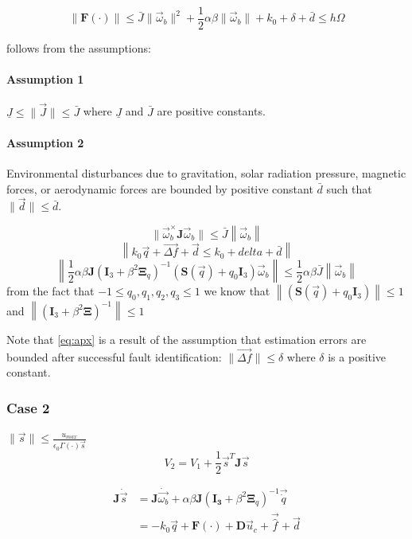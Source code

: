 \begin{equation}
    \lVert\mathbf{F}(\cdot)\rVert \leq \bar{J}\lVert\vec{\omega}_b\rVert^2 + \frac{1}{2}\alpha\beta\lVert\vec{\omega}_b\rVert + k_0 + \delta + \bar{d}	\leq h\Omega 
\end{equation}

follows from the assumptions:
\paragraph{Assumption 1} $\underline{J} \leq \lVert\vec{J}\rVert \leq \bar{J}$ where $\underline{J}$ and $\bar{J}$ are positive constants.

\paragraph{Assumption 2} Environmental disturbances due to gravitation, solar radiation pressure, magnetic forces, or aerodynamic forces are bounded by positive constant $\bar{d}$ such that $\lVert\vec{d}\rVert \leq \bar{d}$.

\begin{equation}
    \lVert\vec{\omega}_b^\times\mathbf{J}\vec{\omega}_b \rVert \leq \bar{J}\left\lVert\vec{\omega}_b\right\rVert 
\end{equation}
\begin{equation}
    \left\lVert k_0\vec{q} + \vec{\Delta f} + \vec{d} \leq k_0 + delta + \bar{d}\right\rVert \label{eq:apx}
\end{equation}
\begin{equation}
    \left\lVert\frac{1}{2}\alpha\beta\mathbf{J}(\mathbf{I}_3 + \beta^2\mathbf{\Xi}_q)^{-1}(\mathbf{S}(\vec{q}) + q_0\mathbf{I}_3)\vec{\omega}_b\right\rVert \leq \frac{1}{2}\alpha\beta\bar{J}\left\lVert\vec{\omega}_b\right\rVert 
\end{equation}
from the fact that $-1 \leq q_0,q_1,q_2,q_3 \leq 1$ we know that $\left\lVert(\mathbf{S}(\vec{q}) + q_0\mathbf{I}_3)\right\rVert  \leq 1$ and $\left\lVert(\mathbf{I}_3+\beta^2\mathbf{\Xi})^{-1}\right\rVert  \leq 1$

Note that \ref{eq:apx} is a result of the assumption that estimation errors are bounded after successful fault identification: $\lVert\vec{\Delta f}\rVert \leq \delta$ where $\delta$ is a positive constant.
\subsubsection{Case 2} $\lVert \vec{s} \rVert \leq \frac{u_{max}}{\epsilon_0\Gamma(\cdot)\vec{s}}$
\begin{equation}
    V_2=V_1+\frac{1}{2}\vec{s}^T\mathbf{J}\vec{s}
\end{equation}

\begin{equation}
    \begin{split}
        \mathbf{J}\dot{\vec{s}}&=
        \mathbf{J}\dot{\vec{\omega_b}} + \alpha\beta\mathbf{J}(\mathbf{I_3}+\beta^2\mathbf{\Xi}_q)^{-1}\vec{\dot{q}}\\
        &=-k_0\vec{q}+\mathbf{F}(\cdot)+\mathbf{D}\vec{u}_{c}+\vec{\hat{f}}+\vec{d}
    \end{split}
\end{equation}